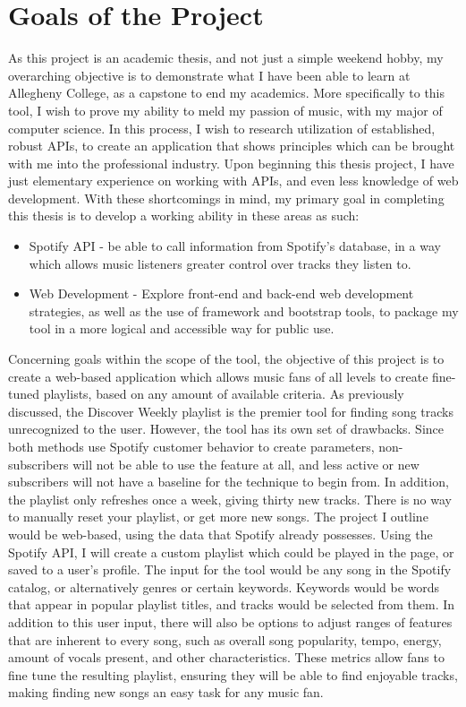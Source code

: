 \section{Goals of the Project}\label{sec:goals}

As this project is an academic thesis, and not just a simple weekend hobby, my
overarching objective is to demonstrate what I have been able to learn at
Allegheny College, as a capstone to end my academics. More specifically to this
tool, I wish to prove my ability to meld my passion of music, with my major of
computer science. In this process, I wish to research utilization of established,
robust APIs, to create an application that shows principles which can be brought
with me into the professional industry. Upon beginning this thesis project, I have
just elementary experience on working with APIs, and even less knowledge of web
development. With these shortcomings in mind, my primary goal in completing this
thesis is to develop a working ability in these areas as such:

\begin{itemize}
  \item Spotify API - be able to call information from Spotify's database, in a
  way which allows music listeners greater control over tracks they listen to.

  \item Web Development - Explore front-end and back-end web development strategies,
  as well as the use of framework and bootstrap tools, to package my tool in a more
  logical and accessible way for public use.
\end{itemize}

Concerning goals within the scope of the tool, the objective of this project is
to create a web-based application which allows music fans of all levels to create
fine-tuned playlists, based on any amount of available criteria. As previously
discussed, the Discover Weekly playlist is the premier tool for finding song
tracks unrecognized to the user. However, the tool has its own set of drawbacks.
Since both methods use Spotify customer behavior to create parameters, non-subscribers
will not be able to use the feature at all, and less active or new subscribers will
not have a baseline for the technique to begin from. In addition, the playlist
only refreshes once a week, giving thirty new tracks. There is no way to manually
reset your playlist, or get more new songs. The project I outline would be web-based,
using the data that Spotify already possesses. Using the Spotify
API, I will create a custom playlist which could be played in the page, or saved to a user's
profile. The input for the tool would be any song in the Spotify catalog, or alternatively
genres or certain keywords. Keywords would be words that appear in popular playlist titles,
and tracks would be selected from them. In addition to this user input, there will also be
options to adjust ranges of features that are inherent to every song, such as overall song
popularity, tempo, energy, amount of vocals present, and other characteristics. These metrics
allow fans to fine tune the resulting playlist, ensuring they will be able to find enjoyable
tracks, making finding new songs an easy task for any music fan.

